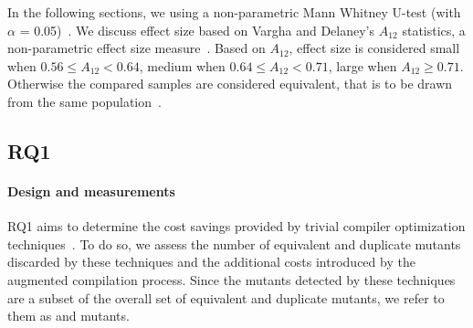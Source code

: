 In the following sections, we 
using a non-parametric Mann Whitney U-test (with $\alpha$ = 0.05)~\cite{Arcuri:practicalGuide:ICSE:2015}.  We discuss effect size based on Vargha and Delaney’s $A_{12}$ statistics, a non-parametric effect size measure~\cite{VDA,Arcuri:practicalGuide:ICSE:2015}. Based on $A_{12}$, effect size is considered small when $0.56 \le A_{12} < 0.64$, medium when $0.64 \le A_{12} < 0.71$, large when $A_{12} \ge 0.71$. Otherwise the compared samples are considered equivalent, that is to be drawn from the same population~\cite{VDA}.


% 







%

\subsection{RQ1}




\paragraph{Design and measurements}

RQ1 aims to determine the cost savings provided by 
trivial compiler optimization techniques~\cite{papadakis2015trivial,kintis2017detecting}. To do so, we assess the number of equivalent and duplicate mutants discarded by these techniques and the additional costs introduced by the augmented compilation process. Since the mutants detected by these techniques 
are a subset of 
the overall set of equivalent and duplicate mutants, we refer to them as  and  mutants.

